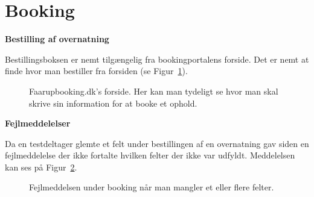 \documentclass[10pt,a4paper]{article}      %
\newcommand\pic[1]{\texttt{[image: Pics/\#1]}}
\renewcommand\good{\pic{good}}
\renewcommand\smallproblem{\pic{smallproblem}}
\begin{document}
\section{Booking}
\begin{kommentarer}
\item[\good] \textbf{Bestilling af overnatning}

Bestillingsboksen er nemt tilgængelig fra bookingportalens forside. Det er nemt at finde hvor man bestiller fra forsiden (se Figur~\ref{fig:forsidebooking}). 


\begin{figure}[htbp]
    \centering
    \caption{Faarupbooking.dk's forside. Her kan man tydeligt se hvor man skal skrive sin information for at booke et ophold.}
    \label{fig:forsidebooking}
\end{figure}

\item[\smallproblem] \textbf{Fejlmeddelelser}

Da en testdeltager glemte et felt under bestillingen af en overnatning gav siden en
fejlmeddelelse der ikke fortalte hvilken felter der ikke var udfyldt. Meddelelsen kan ses på
Figur~\ref{fig:fejlmeddelelsebooking}.

\begin{figure}[htbp]
    \centering
    \caption{Fejlmeddelsen under booking når man mangler et eller flere felter.}
    \label{fig:fejlmeddelelsebooking}
\end{figure}


\end{kommentarer}
\end{document}
